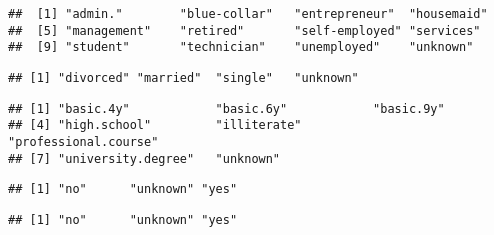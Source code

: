 \documentclass[
]{article}
\newenvironment{Shaded}{\begin{snugshade}}{\end{snugshade}}
\newcommand{\KeywordTok}[1]{\textcolor[rgb]{0.13,0.29,0.53}{\textbf{#1}}}
\newcommand{\NormalTok}[1]{#1}
\newcommand{\OperatorTok}[1]{\textcolor[rgb]{0.81,0.36,0.00}{\textbf{#1}}}
\begin{document}
\begin{verbatim}
##  [1] "admin."        "blue-collar"   "entrepreneur"  "housemaid"    
##  [5] "management"    "retired"       "self-employed" "services"     
##  [9] "student"       "technician"    "unemployed"    "unknown"
\end{verbatim}

\begin{Shaded}
\end{Shaded}

\begin{verbatim}
## [1] "divorced" "married"  "single"   "unknown"
\end{verbatim}

\begin{Shaded}
\end{Shaded}

\begin{verbatim}
## [1] "basic.4y"            "basic.6y"            "basic.9y"           
## [4] "high.school"         "illiterate"          "professional.course"
## [7] "university.degree"   "unknown"
\end{verbatim}

\begin{Shaded}
\end{Shaded}

\begin{verbatim}
## [1] "no"      "unknown" "yes"
\end{verbatim}

\begin{Shaded}
\end{Shaded}

\begin{verbatim}
## [1] "no"      "unknown" "yes"
\end{verbatim}
\end{document}
